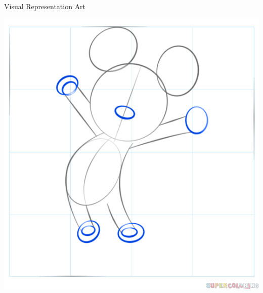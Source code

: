 \documentclass{beamer}
\begin{document}
\begin{frame}[fragile]{Visual Representation}
{Art}

\pause
\begin{center}
\includegraphics[height=0.8\textheight]{images/mickey1.png}
\end{center}
\end{frame}
\end{document}
